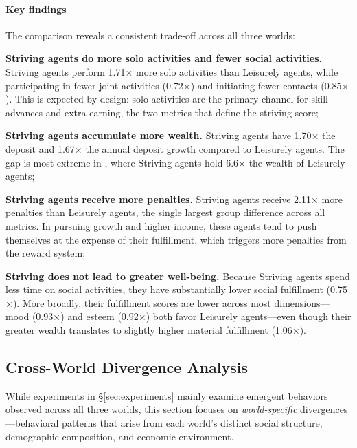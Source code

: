 \paragraph{Key findings}
The comparison reveals a consistent trade-off across all three worlds:
\begin{inparaenum}[\it (1)]
\item \textbf{Striving agents do more solo activities and fewer social activities.}
      Striving agents perform 1.71$\times$ more solo activities than Leisurely agents,
      while participating in fewer joint activities (0.72$\times$)
      and initiating fewer contacts (0.85$\times$).
      This is expected by design:
      solo activities are the primary channel for skill advances and extra earning,
      the two metrics that define the striving score;
\item \textbf{Striving agents accumulate more wealth.}
      Striving agents have 1.70$\times$ the deposit and 1.67$\times$ the annual deposit growth
      compared to Leisurely agents.
      The gap is most extreme in \campus{},
      where Striving agents hold 6.6$\times$ the wealth of Leisurely agents;
\item \textbf{Striving agents receive more penalties.}
      Striving agents receive 2.11$\times$ more penalties than Leisurely agents,
      the single largest group difference across all metrics.
      In pursuing growth and higher income,
      these agents tend to push themselves at the expense of their fulfillment,
      which triggers more penalties from the reward system;
\item \textbf{Striving does not lead to greater well-being.}
      Because Striving agents spend less time on social activities,
      they have substantially lower social fulfillment (0.75$\times$).
      More broadly, their fulfillment scores are lower across most dimensions---mood
      (0.93$\times$) and esteem (0.92$\times$) both favor Leisurely agents---even
      though their greater wealth translates to slightly higher material fulfillment (1.06$\times$).
\end{inparaenum}


\subsection{Cross-World Divergence Analysis}
\label{sec:appendix_cross_world}

While experiments in \S\ref{sec:experiments} mainly examine emergent behaviors observed across all three worlds,
this section focuses on \textit{world-specific} divergences---behavioral patterns
that arise from each world's distinct social structure, demographic composition,
and economic environment.

